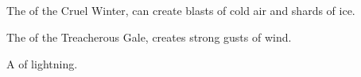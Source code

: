 \begin{comment}
\subsection{Virtues}
Each \Sephirah{} is associated with a \quo{virtue}. These virtures are actually evil and used to control men. These sixteen evil virtues are: 

\begin{itemize}
	\item \Thimared{}: Obedience (prevents masses from rebelling and rulers from sympathizing). 
	\item \Hoshied{}: Tradition (prevents rebellion and change). 
	\item \Cushed{}: Lawfulness (control). 
	\item \Yemared{}: Loyalty (keeps people from questioning). 
	\item \Feazirah{}: Humility (keeps people from complaining). 
	\item \Hapheron{}: Unity (unity with one's own people only, leading to hate of outsiders). 
	\item \Izion{}: Justice (hate of everyone different). 
	\item \Razilah{}: Righteousness (keeps religion from evolving). 
	\item \Keshirah{}: Dilligence (keeps people working). 
	\item \Barion{}: Courage (in the face of outsiders, of course). 
	\item \Atzirah{}: Honour (keeps people inside the system out of fear of dishonour). 
	\item \Teshiron{}: Faith (religious faith, fanaticism). 
	\item \Yeziel{}: Chastity/sexual decency (because sex is dangerous and can lead people astray). 
	\item \Ishiel{}: Patience (makes people accept hardship and oppression). 
	\item \Omariel{}: Acceptance (makes people accept hardship and oppression). 
	\item \Gamishiel{}: Sacrifice (obvious). 
\end{itemize}
\end{comment}



\subsection{\Kliffoth{}}
\begin{description}

\seph{\Horvaleth}
The \Kliffah{} of the Cruel Winter, can create blasts of cold air and shards of ice. 

\seph{\Iphicoss}
The \Kliffah{} of the Treacherous Gale, creates strong gusts of wind. 

\seph{\Nyxachel}
A \Kliffah{} of lightning. 
\end{description}




